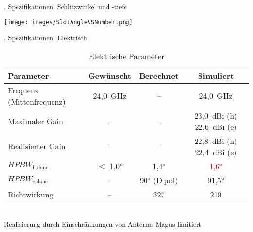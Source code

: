 \documentclass[
  aspectratio=169, %
]{beamer}
\begin{document}

\begin{frame}{\thesection. Spezifikationen: Schlitzwinkel und -tiefe}
    \centering
    \begin{minipage}[t]{\textwidth}
        \texttt{[image: images/SlotAngleVSNumber.png]}
        \label{fig:richtwirkung}
    \end{minipage}
\end{frame}

\begin{frame}{\thesection. Spezifikationen: Elektrisch}
\centering
\footnotesize
\begin{table}[h!]
\caption{Elektrische Parameter}
\label{tab:waveguide_summary}
\begin{tabular}{|l|c|c|c|}
  \hline
  \textbf{Parameter} & \textbf{Gewünscht} & \textbf{Berechnet} & \textbf{Simuliert} \\
  \hline
  Frequenz (Mittenfrequenz) & 24{,}0~GHz & – & 24{,}0~GHz \\
  \hline
  Maximaler Gain & – & – & 23{,}0~dBi (h) \textbar{} 22{,}6~dBi (e) \\
  \hline
  Realisierter Gain & – & – & 22{,}8~dBi (h) \textbar{} 22{,}4~dBi (e) \\
  \hline
  $HPBW_{\mathrm{hplane}}$ & $\leq$ 1{,}0° & 1{,}4° & \textcolor{red}{1{,}6°} \\
  \hline
  $HPBW_{\mathrm{eplane}}$ & – & 90° (Dipol) & 91{,}5° \\
  \hline
  Richtwirkung & – & 327 & 219 \\
  \hline
\end{tabular}
\vspace{3mm}\\
\scriptsize Realisierung durch Einschränkungen von Antenna Magus limitiert
\end{table}
\end{frame}

\end{document}
